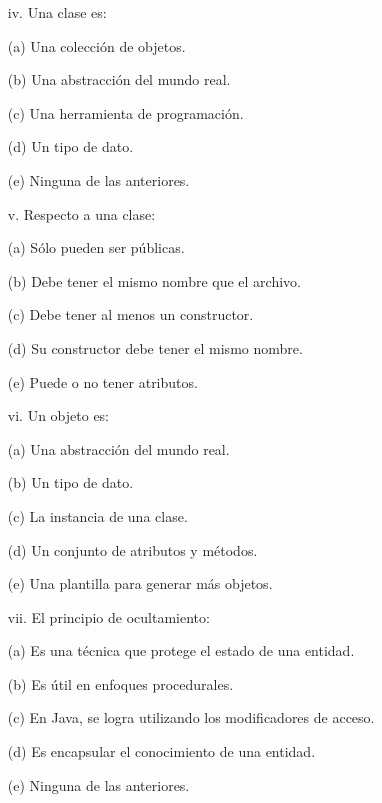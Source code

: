 \documentclass[10pt]{article}
\begin{document}
{\begin{enumerate}
\begin{multicols}{2}
    \begin{enumerate}[label=(\alph*)]
        \item[iv.] Una clase es: 
        \item[(a)] Una colecci\'on de objetos.
        \item[(b)] Una abstracci\'on del mundo real.
        \item[(c)] Una herramienta de programaci\'on.
        \item[(d)] Un tipo de dato.
        \item[(e)] Ninguna de las anteriores.
    \end{enumerate}

    \begin{enumerate}[label=(\alph*)]
        \item[v.] Respecto a una clase:
        \item[(a)] S\'olo pueden ser p\'ublicas.
        \item[(b)] Debe tener el mismo nombre que el archivo.
        \item[(c)] Debe tener al menos un constructor.
        \item[(d)] Su constructor debe tener el mismo nombre.
        \item[(e)] Puede o no tener atributos.
    \end{enumerate}

    \begin{enumerate}[label=(\alph*)]
        \item[vi.] Un objeto es: 
        \item[(a)] Una abstracci\'on del mundo real.
        \item[(b)] Un tipo de dato.
        \item[(c)] La instancia de una clase.
        \item[(d)] Un conjunto de atributos y m\'etodos.
        \item[(e)] Una plantilla para generar m\'as objetos.
    \end{enumerate}

    \begin{enumerate}[label=(\alph*)]
        \item[vii.] El principio de ocultamiento: 
        \item[(a)] Es una t\'ecnica que protege el estado de una entidad.
        \item[(b)] Es \'util en enfoques procedurales.
        \item[(c)] En Java, se logra utilizando los modificadores de acceso.
        \item[(d)] Es encapsular el conocimiento de una entidad.
        \item[(e)] Ninguna de las anteriores.
    \end{enumerate}


\end{multicols}
\end{enumerate}}
\end{document}
